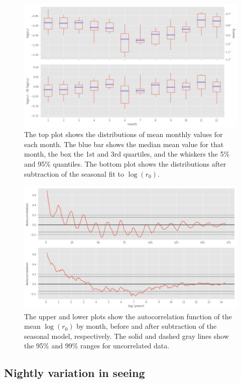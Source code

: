 \documentclass[\docopts]{\docclass}
\begin{document}
\begin{figure}
  \includegraphics[width=\columnwidth]{monthly_boxplot.png}
  \caption{The top plot shows the distributions of mean monthly values
    for each month. The blue bar shows the median mean value for that
    month, the box the 1st and 3rd quartiles, and the whiskers the
    5\% and 95\% quantiles. The bottom plot shows the distributions after
    subtraction of the seasonal fit to $\log(r_0)$.}
  \label{fig:monthly-boxplot}
\end{figure}

\begin{figure}
  \includegraphics[width=\columnwidth]{seasonal_sub_autocorr.png}
  \caption{The upper and lower plots show the autocorrelation function
  of the mean $\log(r_0)$ by month, before and after subtraction of
  the seasonal model, respectively. The solid and dashed gray lines show
  the 95\% and 99\% ranges for uncorrelated data.}
  \label{fig:seasonal-sub-autocorr}
\end{figure}

\subsection{Nightly variation in seeing}
\label{sec:nightly-variation}
\end{document}
